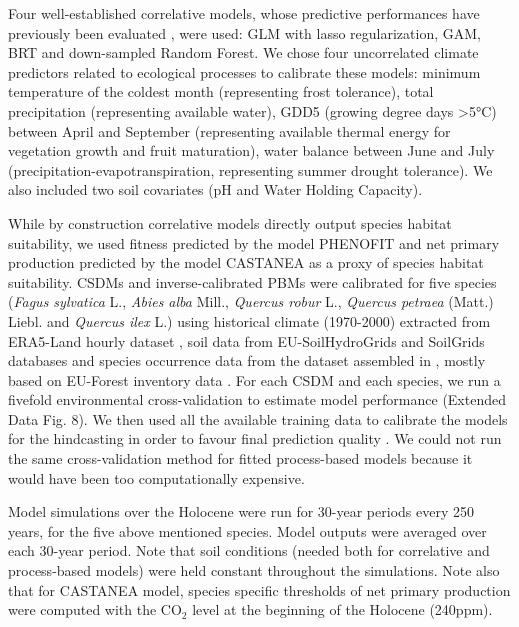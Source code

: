\documentclass[pdflatex, sn-nature]{sn-jnl}%
\newcommand{\textappr}{\raisebox{0.5ex}{\texttildelow}} %
\begin{document}
Four well-established correlative models, whose predictive performances have previously been evaluated \cite{Valavi2022}, were used: GLM with lasso regularization, GAM, BRT and down-sampled Random Forest. We chose four uncorrelated climate predictors related to ecological processes to calibrate these models: minimum temperature of the coldest month (representing frost tolerance), total precipitation (representing available water), GDD5 (growing degree days  \textgreater5°C) between April and September (representing available thermal energy for vegetation growth and fruit maturation), water balance between June and July (precipitation-evapotranspiration, representing summer drought tolerance). We also included two soil covariates (pH and Water Holding Capacity).
  
While by construction correlative models directly output species habitat suitability, we used fitness predicted by the model PHENOFIT and net primary production predicted by the model CASTANEA as a proxy of species habitat suitability. 
CSDMs and inverse-calibrated PBMs were calibrated for five species (\textit{Fagus sylvatica} L., \textit{Abies alba} Mill., \textit{Quercus robur} L., \textit{Quercus petraea}  (Matt.) Liebl. and \textit{Quercus ilex} L.) using historical climate (1970-2000) extracted from ERA5-Land hourly dataset \cite{MunozSabater2021}, soil data from EU-SoilHydroGrids \cite{Toth2017} and SoilGrids \cite{Hengl2017} databases and species occurrence data from the dataset assembled in \cite{VanderMeersch2023}, mostly based on EU-Forest inventory data \cite{Mauri2017}. For each CSDM and each species, we run a fivefold environmental cross-validation to estimate model performance (Extended Data Fig. 8). We then used all the available training data to calibrate the models for the hindcasting in order to favour final prediction quality \cite{Roberts2017}. We could not run the same cross-validation method for fitted process-based models because it would have been too computationally expensive.   

Model simulations over the Holocene were run for 30-year periods every 250 years, for the five above mentioned species. Model outputs were averaged over each 30-year period. Note that soil conditions (needed both for correlative and process-based models) were held constant throughout the simulations. Note also that for CASTANEA model, species specific thresholds of net primary production were computed with the CO$_2$ level at the beginning of the Holocene (\textappr240ppm).
\end{document}

